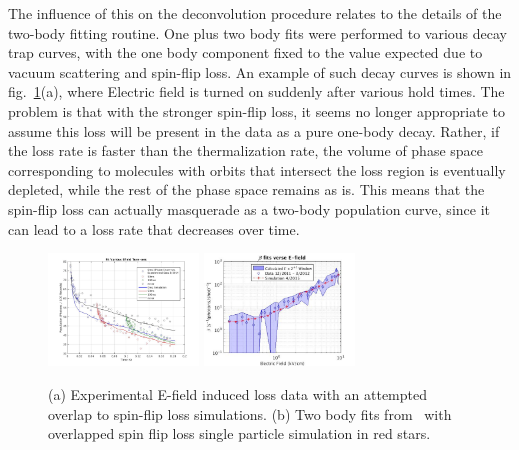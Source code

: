 \documentclass[%
 reprint,
 amsmath,amssymb,
 aps,
prl,
]{revtex4-1}
\begin{document}
The influence of this on the deconvolution procedure relates to the details of the two-body fitting routine. 
One plus two body fits were performed to various decay trap curves, with the one body component fixed to the value expected due to vacuum scattering and spin-flip loss.
An example of  such decay curves is shown in fig.~\ref{fig:eil}(a), where Electric field is turned on suddenly after various hold times.
The problem is that with the stronger spin-flip loss, it seems no longer appropriate to assume this loss will be present in the data as a pure one-body decay.
Rather, if the loss rate is faster than the thermalization rate, the volume of phase space corresponding to molecules with orbits that intersect the loss region is eventually depleted, while the rest of the phase space remains as is.
This means that the spin-flip loss can actually masquerade as a two-body population curve, since it can lead to a loss rate that decreases over time.

\begin{figure}[tb]
\includegraphics[width=4cm]{SuppFigs/EIL.png}%
\includegraphics[width=4cm]{SuppFigs/Beta.png}%
\caption{
(a) Experimental E-field induced loss data with an attempted overlap to spin-flip loss simulations. (b) Two body fits from~\cite{Stuhl2013} with overlapped spin flip loss single particle simulation in red stars.
}
\label{fig:eil}
\end{figure}
\end{document}
